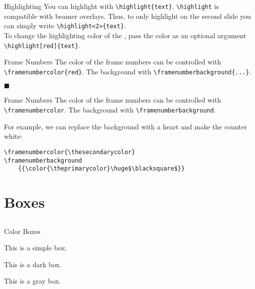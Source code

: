 \documentclass{beamer}
\begin{document}
\begin{frame}[fragile]{Highlighting}
    You can highlight  with \verb|\highlight{text}|. \verb|\highlight| is compatible 
    with beamer overlays. Thus, to only highlight \highlight<2>{text} on the second slide you can 
    simply write \verb|\highlight<2>{text}|.\\[2em]


    To change the highlighting color of the , pass the color 
    as an optional argument \verb|\highlight[red]{text}|.
\end{frame}

\begin{frame}[fragile]{Frame Numbers}
    The color of the frame numbers can be controlled with 
    \verb|\framenumbercolor{red}|. The background with
    \verb|\framenumberbackground{...}|.
\end{frame}

{
    \framenumbercolor{\thesecondarycolor}
    \framenumberbackground
    {{\color{\theprimarycolor}\huge$\blacksquare$}}
\begin{frame}[fragile]{Frame Numbers}
    The color of the frame numbers can be controlled with 
    \verb|\framenumbercolor|. The background with
    \verb|\framenumberbackground|.\vspace{2em}

    For example, we can replace the background with a heart and 
    make the counter white:
    \begin{verbatim}
\framenumbercolor{\thesecondarycolor}
\framenumberbackground
    {{\color{\theprimarycolor}\huge$\blacksquare$}}
    \end{verbatim}
\end{frame}
}

\section{Boxes}
\subsection{}

\begin{frame}{Color Boxes}
    \begin{defaultbox}
        This is a simple box.
    \end{defaultbox}

    \begin{darkbox}
        This is a dark box.
    \end{darkbox}

    \begin{graybox}
        This is a gray box.
    \end{graybox}
\end{frame}
\end{document}
